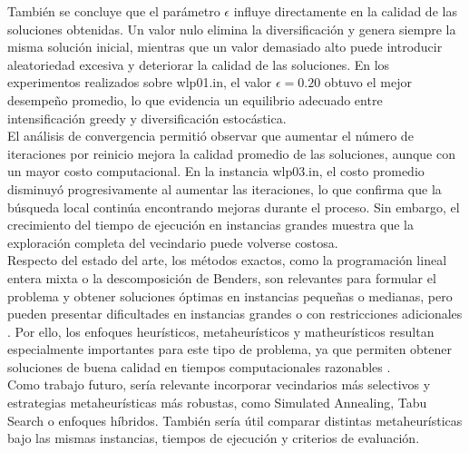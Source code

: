 \noindent También se concluye que el parámetro \(\epsilon\) influye directamente en la calidad de las soluciones obtenidas. Un valor nulo elimina la diversificación y genera siempre la misma solución inicial, mientras que un valor demasiado alto puede introducir aleatoriedad excesiva y deteriorar la calidad de las soluciones. En los experimentos realizados sobre wlp01.in, el valor \(\epsilon = 0.20\) obtuvo el mejor desempeño promedio, lo que evidencia un equilibrio adecuado entre intensificación greedy y diversificación estocástica.\\

\noindent El análisis de convergencia permitió observar que aumentar el número de iteraciones por reinicio mejora la calidad promedio de las soluciones, aunque con un mayor costo computacional. En la instancia wlp03.in, el costo promedio disminuyó progresivamente al aumentar las iteraciones, lo que confirma que la búsqueda local continúa encontrando mejoras durante el proceso. Sin embargo, el crecimiento del tiempo de ejecución en instancias grandes muestra que la exploración completa del vecindario puede volverse costosa.\\

\noindent Respecto del estado del arte, los métodos exactos, como la programación lineal entera mixta o la descomposición de Benders, son relevantes para formular el problema y obtener soluciones óptimas en instancias pequeñas o medianas, pero pueden presentar dificultades en instancias grandes o con restricciones adicionales \cite{fischetti2016benders}. Por ello, los enfoques heurísticos, metaheurísticos y matheurísticos resultan especialmente importantes para este tipo de problema, ya que permiten obtener soluciones de buena calidad en tiempos computacionales razonables \cite{maia2023metaheuristic,mansini2022kernel}.\\

\noindent Como trabajo futuro, sería relevante incorporar vecindarios más selectivos y estrategias metaheurísticas más robustas, como Simulated Annealing, Tabu Search o enfoques híbridos. También sería útil comparar distintas metaheurísticas bajo las mismas instancias, tiempos de ejecución y criterios de evaluación.